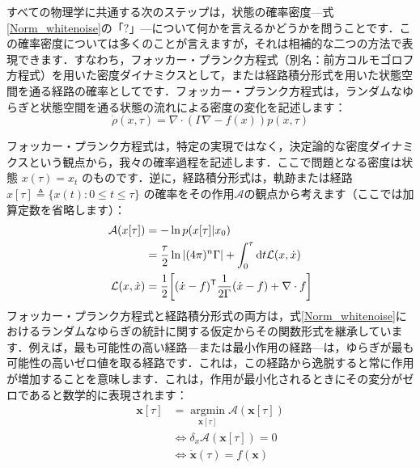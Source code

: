 \documentclass[a4paper, titlepage]{jsarticle}
\begin{document}
\par
すべての物理学に共通する次のステップは，状態の確率密度—式\eqref{Norm_whitenoise}の「$?$」—について何かを言えるかどうかを問うことです．この確率密度については多くのことが言えますが，それは相補的な二つの方法で表現できます．すなわち，フォッカー・プランク方程式（別名：前方コルモゴロフ方程式）を用いた密度ダイナミクスとして，または経路積分形式を用いた状態空間を通る経路の確率としてです．フォッカー・プランク方程式は，ランダムなゆらぎと状態空間を通る状態の流れによる密度の変化を記述します：
\begin{equation}\label{Fokker_Planck}
    \dot{\rho}(x, \tau) = \nabla \cdot (\Gamma \nabla - f(x))p(x, \tau)  
\end{equation}
\par
フォッカー・プランク方程式は，特定の実現ではなく，決定論的な密度ダイナミクスという観点から，我々の確率過程を記述します．ここで問題となる密度は状態 $x(\tau) = x_t$ のものです．逆に，経路積分形式は，軌跡または経路 $x[\tau]\triangleq\{x(t): 0 \le t \le \tau\}$ の確率をその作用$\mathcal{A}$の観点から考えます（ここでは加算定数を省略します）：
\begin{equation}\label{Fokker_Planck_PathIntegral}
    \begin{aligned}
        \mathcal{A}(x[\tau]) &= - \ln p(x[\tau] | x_0) \\
        &= \frac{\tau}{2} \ln |(4\pi)^n\Gamma| + \int_0^\tau \mathrm{d}t \mathcal{L}(x, \dot{x}) \\
        \mathcal{L}(x, \dot{x}) &= \frac{1}{2}\qty[(\dot{x} - f)^\mathsf{T}\frac{1}{2\Gamma}(\dot{x} - f) + \nabla \cdot f]
    \end{aligned}
\end{equation}
フォッカー・プランク方程式と経路積分形式の両方は，式\eqref{Norm_whitenoise}におけるランダムなゆらぎの統計に関する仮定からその関数形式を継承しています．例えば，最も可能性の高い経路—または最小作用の経路—は，ゆらぎが最も可能性の高いゼロ値を取る経路です．これは，この経路から逸脱すると常に作用が増加することを意味します．これは，作用が最小化されるときにその変分がゼロであると数学的に表現されます：
\begin{equation}\label{Minimum_Path}
    \begin{aligned}
        \mathbf{x}[\tau] &= \underset{\mathbf{x}[\tau]}{\operatorname{argmin}}\mathcal{A}(\mathbf{x}[\tau]) \\
        &\Leftrightarrow \delta_x \mathcal{A}(\mathbf{x}[\tau]) = 0 \\
        &\Leftrightarrow \dot{\mathbf{x}}(\tau) = f(\mathbf{x})
    \end{aligned}
\end{equation}
\end{document}
